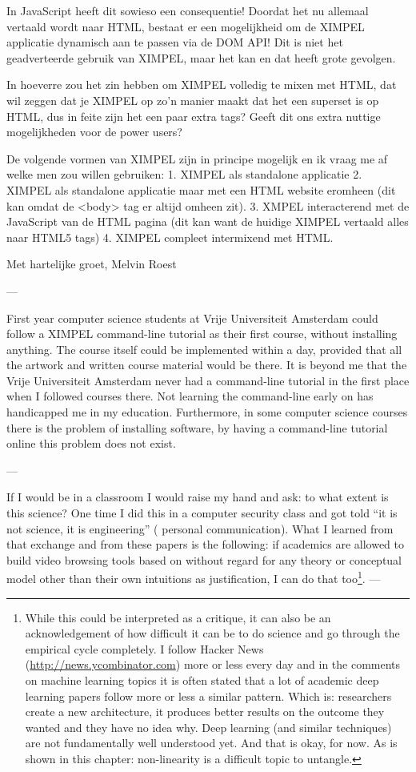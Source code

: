 In JavaScript heeft dit sowieso een consequentie! Doordat het nu allemaal vertaald wordt naar HTML, bestaat er een mogelijkheid om de XIMPEL applicatie dynamisch aan te passen via de DOM API! Dit is niet het geadverteerde gebruik van XIMPEL, maar het kan en dat heeft grote gevolgen.

In hoeverre zou het zin hebben om XIMPEL volledig te mixen met HTML, dat wil zeggen dat je XIMPEL op zo'n manier maakt dat het een superset is op HTML, dus in feite zijn het een paar extra tags? Geeft dit ons extra nuttige mogelijkheden voor de power users?

De volgende vormen van XIMPEL zijn in principe mogelijk en ik vraag me af welke men zou willen gebruiken:
1. XIMPEL als standalone applicatie
2. XIMPEL als standalone applicatie maar met een HTML website eromheen (dit kan omdat de <body> tag er altijd omheen zit).
3. XMPEL interacterend met de JavaScript van de HTML pagina (dit kan want de huidige XIMPEL vertaald alles naar HTML5 tags)
4. XIMPEL compleet intermixend met HTML.

Met hartelijke groet,
Melvin Roest

---

First year computer science students at Vrije Universiteit Amsterdam could follow a XIMPEL command-line tutorial as their first course, without installing anything. The course itself could be implemented within a day, provided that all the artwork and written course material would be there. It is beyond me that the Vrije Universiteit Amsterdam never had a command-line tutorial in the first place when I followed courses there. Not learning the command-line early on has handicapped me in my education. Furthermore, in some computer science courses there is the problem of installing software, by having a command-line tutorial online this problem does not exist.

---

If I would be in a classroom I would raise my hand and ask: to what extent is this science? One time I did this in a computer security class and got told ``it is not science, it is engineering'' (\cite{bama2015} personal communication). What I learned from that exchange and from these papers is the following: if academics are allowed to build video browsing tools based on without regard for any theory or conceptual model other than their own intuitions as justification, I can do that too\footnote{While this could be interpreted as a critique, it can also be an acknowledgement of how difficult it can be to do science and go through the empirical cycle completely. I follow Hacker News (\url{http://news.ycombinator.com}) more or less every day and in the comments on machine learning topics it is often stated that a lot of academic deep learning papers follow more or less a similar pattern. Which is: researchers create a new architecture, it produces better results on the outcome they wanted and they have no idea why. Deep learning (and similar techniques) are not fundamentally well understood yet. And that is okay, for now. As is shown in this chapter: non-linearity is a difficult topic to untangle.}.
---

